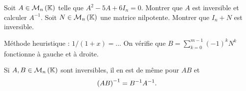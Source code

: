 \documentclass{magnolia}
\begin{document}
  \begin{exos}
    \exo Soit $A\in\mathcal{M}_{n}\left(\mathbb{K}\right)$ telle que $A^2-5A+6I_n=0$. Montrer que $A$ est
      inversible et calculer $A^{-1}$.
    \exo Soit $N\in\mathcal{M}_{n}\left(\mathbb{K}\right)$ une matrice nilpotente. Montrer que $I_n+N$ est
    inversible.
    \begin{sol}
    Méthode heuristique : $1/(1+x)=...$
    On vérifie que $B=\displaystyle\sum_{k=0}^{m-1}(-1)^kN^k$ fonctionne à gauche et à droite.
    \end{sol}
    \end{exos}
  
  \begin{proposition}[utile=-3]
  Si $A,B\in\mathcal{M}_{n}\left(\mathbb{K}\right)$ sont inversibles, il en est de même pour $AB$ et
  \[\left(AB\right)^{-1}=B^{-1}A^{-1}.\]
  \end{proposition}
  
\end{document}
